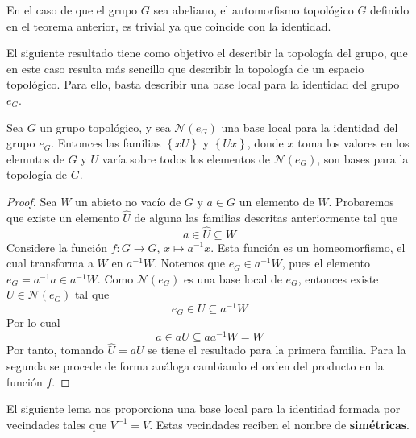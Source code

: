 \documentclass[12pt]{report}
\theoremstyle{largebreak}
\newcommand{\cf}[3]{\ensuremath{#1:#2\rightarrow#3}}
\newcommand{\N}[1]{\ensuremath{\mathscr{N}(#1)}}
\begin{document}
    \begin{obs}
        En el caso de que el grupo $G$ sea abeliano, el automorfismo topológico $G$ definido en el teorema anterior, es trivial ya que coincide con la identidad.
    \end{obs}

    El siguiente resultado tiene como objetivo el describir la topología del grupo, que en este caso resulta más sencillo que describir la topología de un espacio topológico. Para ello, basta describir una base local para la identidad del grupo $e_G$.

    \begin{lema}
        Sea $G$ un grupo topológico, y sea $\N{e_G}$ una base local para la identidad del grupo $e_G$. Entonces las familias $\left\{xU\right\}$ y $\left\{Ux\right\}$, donde $x$ toma los valores en los elemntos de $G$ y $U$ varía sobre todos los elementos de $\N{e_G}$, son bases para la topología de $G$.
    \end{lema}

    \begin{proof}
        Sea $W$ un abieto no vacío de $G$ y $a\in G$ un elemento de $W$. Probaremos que existe un elemento $\hat{U}$ de alguna las familias descritas anteriormente tal que
        \begin{equation*}
            a\in\hat{U}\subseteq W
        \end{equation*}
        Considere la función $\cf{f}{G}{G}$, $x\mapsto a^{-1}x$. Esta función es un homeomorfismo, el cual transforma a $W$ en $a^{-1}W$. Notemos que $e_G\in a^{-1}W$, pues el elemento $e_G=a^{-1}a\in a^{-1}W$. Como $\N{e_G}$ es una base local de $e_G$, entonces existe $U\in\N{e_G}$ tal que
        \begin{equation*}
            e_G\in U \subseteq a^{-1}W
        \end{equation*}
        Por lo cual
        \begin{equation*}
            a\in aU \subseteq aa^{-1}W=W
        \end{equation*}
        Por tanto, tomando $\hat{U}=aU$ se tiene el resultado para la primera familia. Para la segunda se procede de forma análoga cambiando el orden del producto en la función $f$.
    \end{proof}

    El siguiente lema nos proporciona una base local para la identidad formada por vecindades tales que $V^{-1}=V$. Estas vecindades reciben el nombre de \textbf{simétricas}.
\end{document}
